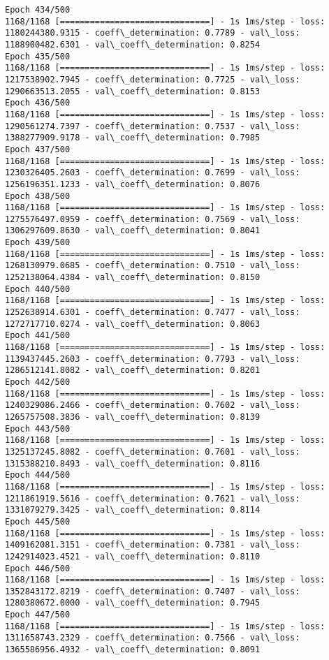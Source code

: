 \documentclass[11pt]{article}
\begin{document}
\begin{Verbatim}[commandchars=\\\{\}]
Epoch 434/500
1168/1168 [==============================] - 1s 1ms/step - loss: 1180244380.9315 - coeff\_determination: 0.7789 - val\_loss: 1188900482.6301 - val\_coeff\_determination: 0.8254
Epoch 435/500
1168/1168 [==============================] - 1s 1ms/step - loss: 1217538902.7945 - coeff\_determination: 0.7725 - val\_loss: 1290663513.2055 - val\_coeff\_determination: 0.8153
Epoch 436/500
1168/1168 [==============================] - 1s 1ms/step - loss: 1290561274.7397 - coeff\_determination: 0.7537 - val\_loss: 1388277909.9178 - val\_coeff\_determination: 0.7985
Epoch 437/500
1168/1168 [==============================] - 1s 1ms/step - loss: 1230326405.2603 - coeff\_determination: 0.7699 - val\_loss: 1256196351.1233 - val\_coeff\_determination: 0.8076
Epoch 438/500
1168/1168 [==============================] - 1s 1ms/step - loss: 1275576497.0959 - coeff\_determination: 0.7569 - val\_loss: 1306297609.8630 - val\_coeff\_determination: 0.8041
Epoch 439/500
1168/1168 [==============================] - 1s 1ms/step - loss: 1268130979.0685 - coeff\_determination: 0.7510 - val\_loss: 1252138064.4384 - val\_coeff\_determination: 0.8150
Epoch 440/500
1168/1168 [==============================] - 1s 1ms/step - loss: 1252638914.6301 - coeff\_determination: 0.7477 - val\_loss: 1272717710.0274 - val\_coeff\_determination: 0.8063
Epoch 441/500
1168/1168 [==============================] - 1s 1ms/step - loss: 1139437445.2603 - coeff\_determination: 0.7793 - val\_loss: 1286512141.8082 - val\_coeff\_determination: 0.8201
Epoch 442/500
1168/1168 [==============================] - 1s 1ms/step - loss: 1240329086.2466 - coeff\_determination: 0.7602 - val\_loss: 1265757508.3836 - val\_coeff\_determination: 0.8139
Epoch 443/500
1168/1168 [==============================] - 1s 1ms/step - loss: 1325137245.8082 - coeff\_determination: 0.7601 - val\_loss: 1315388210.8493 - val\_coeff\_determination: 0.8116
Epoch 444/500
1168/1168 [==============================] - 1s 1ms/step - loss: 1211861919.5616 - coeff\_determination: 0.7621 - val\_loss: 1331079279.3425 - val\_coeff\_determination: 0.8114
Epoch 445/500
1168/1168 [==============================] - 1s 1ms/step - loss: 1409162081.3151 - coeff\_determination: 0.7381 - val\_loss: 1242914023.4521 - val\_coeff\_determination: 0.8110
Epoch 446/500
1168/1168 [==============================] - 1s 1ms/step - loss: 1352843172.8219 - coeff\_determination: 0.7407 - val\_loss: 1280380672.0000 - val\_coeff\_determination: 0.7945
Epoch 447/500
1168/1168 [==============================] - 1s 1ms/step - loss: 1311658743.2329 - coeff\_determination: 0.7566 - val\_loss: 1365586956.4932 - val\_coeff\_determination: 0.8091

\end{Verbatim}
\end{document}
